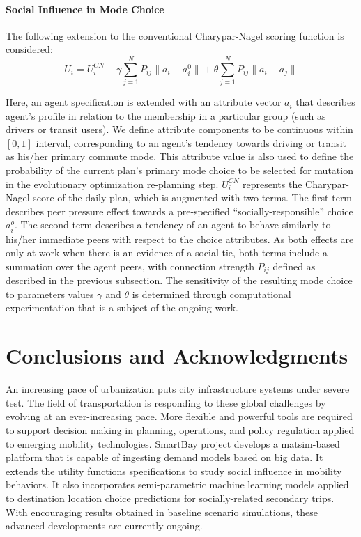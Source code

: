 \paragraph{Social Influence in Mode Choice} 
The following extension to the conventional Charypar-Nagel scoring function is considered:
\begin{equation*}
U_i=U_i^{CN} - \gamma \sum_{j=1}^N P_{ij} \| a_i - a_i^0 \| + \theta \sum_{j=1}^N P_{ij} \| a_i - a_j \|
\end{equation*}

Here, an agent specification is extended with an attribute vector $a_i$ that describes agent's profile in relation to the membership in a particular group (such as drivers or transit users). We define attribute components to be continuous within $\left[0, 1\right]$ interval, corresponding to an agent's tendency towards driving or transit as his/her primary commute mode. This attribute value is also used to define the probability of the current plan's primary mode choice to be selected for mutation in the evolutionary optimization re-planning step. $U_i^{CN}$ represents the Charypar-Nagel score of the daily plan, which is augmented with two terms. The first term describes peer pressure effect towards a pre-specified ``socially-responsible'' choice $a_i^o$. The second term describes a tendency of an agent to behave similarly to his/her immediate peers with respect to the choice attributes. As both effects are only at work when there is an evidence of a social tie, both terms include a summation over the agent peers, with connection strength $P_{ij}$ defined as described in the previous subsection. The sensitivity of the resulting mode choice to parameters values $\gamma$ and $\theta$ is determined through computational experimentation that is a subject of the ongoing work.

\section{Conclusions and Acknowledgments}
An increasing pace of urbanization puts city infrastructure systems under severe test. The field of transportation is responding to these global challenges by evolving at an ever-increasing pace. More flexible and powerful tools are required to support decision making in planning, operations, and policy regulation applied to emerging mobility technologies. SmartBay project develops a \gls{matsim}-based platform that is capable of ingesting demand models based on big data. It extends the utility functions specifications to study social influence in mobility behaviors. It also incorporates semi-parametric machine learning models applied to destination location choice predictions for socially-related secondary trips. With encouraging results obtained in baseline scenario simulations, these advanced developments are currently ongoing. 

